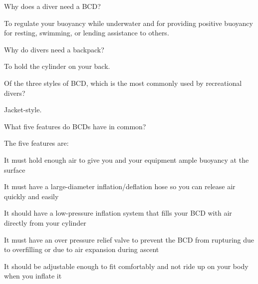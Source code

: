 	\begin{qanda}
		\begin{question}
Why does a diver need a BCD?
		\end{question}

		\begin{answer}
To regulate your buoyancy while underwater and for providing positive buoyancy for resting, swimming, or lending assistance to others.
		\end{answer}
	\end{qanda}

	\begin{qanda}
		\begin{question}
Why do divers need a backpack?
		\end{question}

		\begin{answer}
To hold the cylinder on your back.
		\end{answer}
	\end{qanda}

	\begin{qanda}
		\begin{question}
Of the three styles of BCD, which is the most commonly used by recreational divers?
		\end{question}

		\begin{answer}
Jacket-style.
		\end{answer}
	\end{qanda}

	\begin{qanda}
		\begin{question}
What five features do BCDs have in common?
		\end{question}

		\begin{answer}
The five features are:
			\begin{nospacenumberedlist}
 				\item It must hold enough air to give you and your equipment ample buoyancy at the surface
 				\item It must have a large-diameter inflation/deflation hose so you can release air quickly and easily
 				\item It should have a low-pressure inflation system that fills your BCD with air directly from your cylinder
 				\item It must have an over pressure relief valve to prevent the BCD from rupturing due to overfilling or due to air expansion during ascent
 				\item It should be adjustable enough to fit comfortably and not ride up on your body when you inflate it
			\end{nospacenumberedlist}
		\end{answer}
	\end{qanda}

